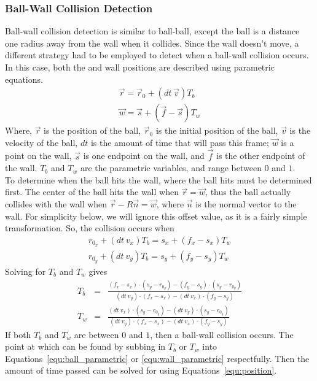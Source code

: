         \subsubsection{Ball-Wall Collision Detection}
        Ball-wall collision detection is similar to ball-ball, except the ball is a distance one radius away from the wall when it collides.
        Since the wall doesn't move, a different strategy had to be employed to detect when a ball-wall collision occurs. In this case,
        both the and wall positions are described using parametric equations.
        \begin{eqnarray}
            \vec r = \vec r_0 + (dt~\vec v) T_b         \label{equ:ball_parametric} \\
            \vec w = \vec s + (\vec f - \vec s) T_w     \label{equ:wall_parametric}
        \end{eqnarray}
        Where, $\vec r$ is the position of the ball, $\vec r_0$ is the initial position of the ball, $\vec v$ is the velocity of the ball,
        $dt$ is the amount of time that will pass this frame; $\vec w$ is a point on the wall, $\vec s$ is one endpoint on the wall, and $\vec f$
        is the other endpoint of the wall. $T_b$ and $T_w$ are the parametric variables, and range between $0$ and $1$. \\
        To determine when the ball hits the wall, where the ball hits must be determined first. The center of the ball hits the wall when
        $\vec r = \vec w$, thus the ball actually collides with the wall when $\vec r - R \vec n = \vec w$, where $\vec n$ is the normal
        vector to the wall. For simplicity below, we will ignore this offset value, as it is a fairly simple transformation. So, the collision
        occurs when
        \begin{eqnarray}
            r_{0_x} + (dt~v_x) T_b = s_x + (f_x - s_x) T_w  \nonumber \\
            r_{0_y} + (dt~v_y) T_b = s_y + (f_y - s_y) T_w  \nonumber
        \end{eqnarray}
        Solving for $T_b$ and $T_w$ gives
        \begin{eqnarray}
            T_b &=& \frac{(f_x - s_x)\cdot(s_y - r_{0_y}) - (f_y - s_y)\cdot(s_y - r_{0_y})}{(dt~v_y)\cdot(f_x - s_x) - (dt~v_x)\cdot(f_y - s_y)} \nonumber \\
            T_w &=& \frac{(dt~v_x)\cdot(s_y - r_{0_y}) - (dt~v_y)\cdot(s_y - r_{0_y})}{(dt~v_y)\cdot(f_x - s_x) - (dt~v_x)\cdot(f_y - s_y)} \nonumber
        \end{eqnarray}
        If both $T_b$ and $T_w$ are between $0$ and $1$, then a ball-wall collision occurs. The point at which can be found by subbing in $T_b$ or $T_w$
        into Equations~\ref{equ:ball_parametric} or \ref{equ:wall_parametric} respectfully. Then the amount of time passed can be solved for using Equations~\ref{equ:position}.
    
